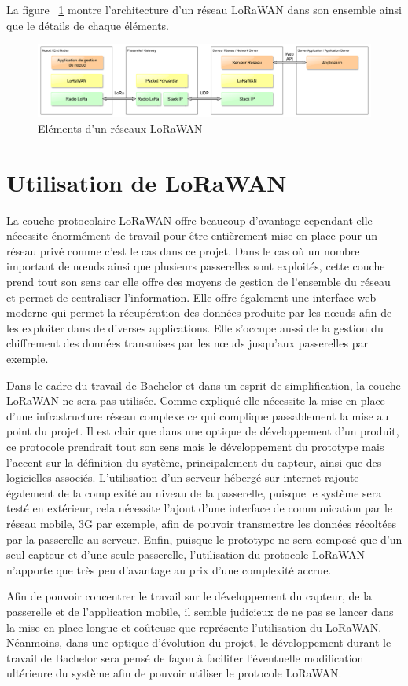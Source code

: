 La figure ~\ref{fig:network_lorawan}  montre l’architecture d’un réseau LoRaWAN dans son ensemble ainsi que le détails de chaque éléments.

\begin{figure}[htb]
\centering 
\includegraphics[width=1\columnwidth]{../images/lorawan_reseau.png} 
\caption[Eléments d'un réseaux LoRaWAN]{Eléments d'un réseaux LoRaWAN}
\label{fig:network_lorawan}
\end{figure}

\section{Utilisation de LoRaWAN}

La couche protocolaire LoRaWAN offre beaucoup d’avantage cependant elle nécessite énormément de travail pour être entièrement mise en place pour un réseau privé comme c’est le cas dans ce projet. Dans le cas où un nombre important de nœuds ainsi que plusieurs passerelles sont exploités, cette couche prend tout son sens car elle offre des moyens de gestion de l’ensemble du réseau et permet de centraliser l’information. Elle offre également une interface web moderne qui permet la récupération des données produite par les nœuds afin de les exploiter dans de diverses applications. Elle s’occupe aussi de la gestion du chiffrement des données transmises par les nœuds jusqu’aux passerelles par exemple.

Dans le cadre du travail de Bachelor et dans un esprit de simplification, la couche LoRaWAN ne sera pas utilisée. Comme expliqué elle nécessite la mise en place d’une infrastructure réseau complexe ce qui complique passablement la mise au point du projet. Il est clair que dans une optique de développement d’un produit, ce protocole prendrait tout son sens mais le développement du prototype mais l’accent sur la définition du système, principalement du capteur, ainsi que des logicielles associés. L’utilisation d’un serveur hébergé sur internet rajoute également de la complexité au niveau de la passerelle, puisque le système sera testé en extérieur, cela nécessite l’ajout d’une interface de communication par le réseau mobile, 3G par exemple, afin de pouvoir transmettre les données récoltées par la passerelle au serveur. Enfin, puisque le prototype ne sera composé que d’un seul capteur et d’une seule passerelle, l’utilisation du protocole LoRaWAN n’apporte que très peu d’avantage au prix d’une complexité accrue.

Afin de pouvoir concentrer le travail sur le développement du capteur, de la passerelle et de l’application mobile, il semble judicieux de ne pas se lancer dans la mise en place longue et coûteuse que représente l’utilisation du LoRaWAN. Néanmoins, dans une optique d’évolution du projet, le développement durant le travail de Bachelor sera pensé de façon à faciliter l’éventuelle modification ultérieure du système afin de pouvoir utiliser le protocole LoRaWAN.
